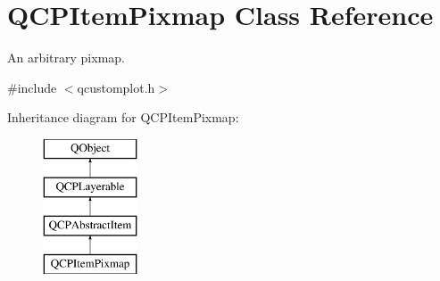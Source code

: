 \hypertarget{class_q_c_p_item_pixmap}{}\section{Q\+C\+P\+Item\+Pixmap Class Reference}
\label{class_q_c_p_item_pixmap}


An arbitrary pixmap.  




{\ttfamily \#include $<$qcustomplot.\+h$>$}

Inheritance diagram for Q\+C\+P\+Item\+Pixmap\+:\begin{figure}[H]
\begin{center}
\leavevmode
\includegraphics[height=4.000000cm]{d7/dbd/class_q_c_p_item_pixmap}
\end{center}
\end{figure}
